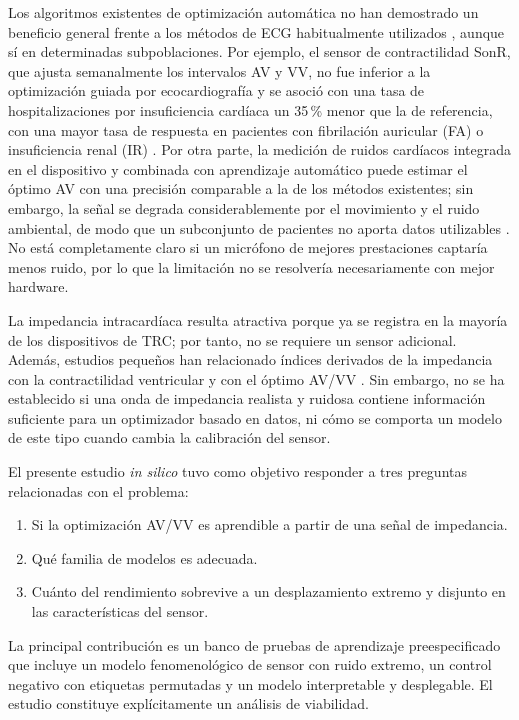 \documentclass[11pt,a4paper]{article}
\begin{document}
Los algoritmos existentes de optimización automática no han demostrado un
beneficio general frente a los métodos de ECG habitualmente utilizados
\citep{knijnik2023}, aunque sí en determinadas subpoblaciones. Por ejemplo, el
sensor de contractilidad SonR, que ajusta semanalmente los intervalos AV y VV, no
fue inferior a la optimización guiada por ecocardiografía y se asoció con una
tasa de hospitalizaciones por insuficiencia cardíaca un 35\,\% menor que la de
referencia, con una mayor tasa de respuesta en pacientes con fibrilación
auricular (FA) o insuficiencia renal (IR) \citep{brugada2016,singh2017}. Por otra
parte, la medición de ruidos cardíacos integrada en el dispositivo y combinada
con aprendizaje automático puede estimar el óptimo AV con una precisión
comparable a la de los métodos existentes; sin embargo, la señal se degrada
considerablemente por el movimiento y el ruido ambiental, de modo que un
subconjunto de pacientes no aporta datos utilizables \citep{westphal2023}. No
está completamente claro si un micrófono de mejores prestaciones captaría menos
ruido, por lo que la limitación no se resolvería necesariamente con mejor
hardware.

La impedancia intracardíaca resulta atractiva porque ya se registra en la mayoría
de los dispositivos de TRC; por tanto, no se requiere un sensor adicional.
Además, estudios pequeños han relacionado índices derivados de la impedancia con
la contractilidad ventricular y con el óptimo AV/VV
\citep{bocchiardo2010,ginks2011}. Sin embargo, no se ha establecido si una onda de
impedancia realista y ruidosa contiene información suficiente para un optimizador
basado en datos, ni cómo se comporta un modelo de este tipo cuando cambia la
calibración del sensor.

El presente estudio \emph{in silico} tuvo como objetivo responder a tres preguntas
relacionadas con el problema:
\begin{enumerate}[leftmargin=1.5em,itemsep=0.2em]
  \item Si la optimización AV/VV es aprendible a partir de una señal de
        impedancia.
  \item Qué familia de modelos es adecuada.
  \item Cuánto del rendimiento sobrevive a un desplazamiento extremo y disjunto
        en las características del sensor.
\end{enumerate}

La principal contribución es un banco de pruebas de aprendizaje preespecificado
que incluye un modelo fenomenológico de sensor con ruido extremo, un control
negativo con etiquetas permutadas y un modelo interpretable y desplegable. El
estudio constituye explícitamente un análisis de viabilidad.
\end{document}
